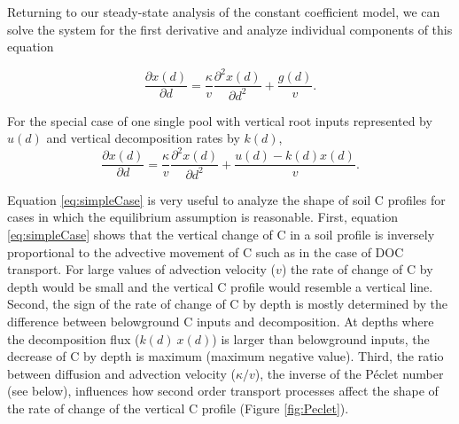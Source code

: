\documentclass[11pt, oneside, a4paper]{article}   	%
\begin{document}
Returning to our steady-state analysis of the constant coefficient model, we can solve the system for the first derivative and analyze individual components of this equation

\begin{equation}
\frac{\partial x(d)}{\partial d} = \frac{\kappa}{v} \frac{\partial^2 x(d)}{\partial d^2} + \frac{g(d)}{v}.
\end{equation}

For the special case of one single pool with vertical root inputs represented by $u(d)$ and vertical decomposition rates by $k(d)$,
\begin{equation} \label{eq:simpleCase}
\frac{\partial x(d)}{\partial d} = \frac{\kappa}{v} \frac{\partial^2 x(d)}{\partial d^2} + \frac{u(d) - k(d) x(d)}{v}.
\end{equation}

Equation \ref{eq:simpleCase} is very useful to analyze the shape of soil C profiles for cases in which the equilibrium assumption is reasonable. 
First, equation \ref{eq:simpleCase} shows that the vertical change of C in a soil profile is inversely proportional to the advective movement of C such as in the case of DOC transport. For large values of advection velocity ($v$) the rate of change of C by depth would be small and the vertical C profile would resemble a vertical line. Second, the sign of the rate of change of C by depth is mostly determined by the difference between belowground C inputs and decomposition. At depths where the decomposition flux ($k(d) \ x(d)$) is larger than belowground inputs, the decrease of C by depth is maximum (maximum negative value). Third, the ratio between diffusion and advection velocity ($\kappa / v$), the inverse of the Péclet number (see below), influences how second order transport processes affect the shape of the rate of change of the vertical C profile (Figure \ref{fig:Peclet}). 
\end{document}
